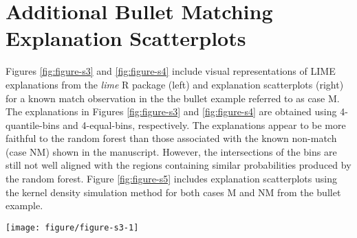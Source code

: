 \documentclass{article}\usepackage[]{graphicx}\usepackage[]{color}
\newenvironment{knitrout}{}{} %
\begin{document}
\section{Additional Bullet Matching Explanation Scatterplots}

Figures \ref{fig:figure-s3} and \ref{fig:figure-s4} include visual representations of LIME explanations from the \emph{lime} R package (left) and explanation scatterplots (right) for a known match observation in the the bullet example referred to as case M. The explanations in Figures \ref{fig:figure-s3} and \ref{fig:figure-s4} are obtained using 4-quantile-bins and 4-equal-bins, respectively. The explanations appear to be more faithful to the random forest than those associated with the known non-match (case NM) shown in the manuscript. However, the intersections of the bins are still not well aligned with the regions containing similar probabilities produced by the random forest. Figure \ref{fig:figure-s5} includes explanation scatterplots using the kernel density simulation method for both cases M and NM from the bullet example.

\vspace{0.5cm}



\renewcommand{\thefigure}{S3}
\begin{figure*}[!h]
\begin{knitrout}
\color{fgcolor}

{\centering \texttt{[image: figure/figure-s3-1]} 

}



\end{knitrout}
\caption{Explanation plot from \emph{lime} R package (left) and explanation scatterplot (right) for case M in the bullet test data for 4-quantile-bins.}
\label{fig:figure-s3}
\end{figure*}
\end{document}
